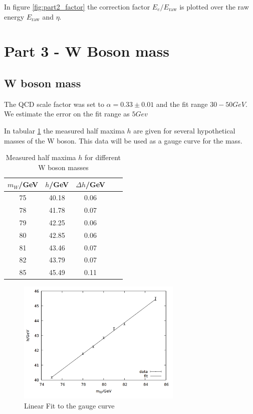 In figure \ref{fig:part2_factor} the correction factor $E_e/E_{\mathrm{raw}}$ is plotted over the raw energy $E_{\mathrm{raw}}$ and $\eta$. 

\section{Part 3 - W Boson mass}

\subsection{W boson mass}

The QCD scale factor was set to $\alpha = 0.33 \pm 0.01$ and the fit range $30 - 50 \si{GeV}$. We estimate the error on the fit range as $5 \si{Gev}$

In tabular \ref{tab:task3_33} the measured half maxima $h$ are given for several hypothetical masses of the W boson. This data will be used as a gauge curve for the mass.

\begin{table}
\centering
\caption{Measured half maxima $h$ for different W boson masses}
\begin{tabular}{ccccc}
\toprule
$m_W$/GeV & $h$/GeV & $\Delta h$/GeV\\ 
\midrule
75&	40.18&	0.06\\
78&	41.78&	0.07\\
79&	42.25&	0.06\\
80&	42.85&	0.06\\
81&	43.46&	0.07\\
82&	43.79&	0.07\\
85&	45.49&	0.11\\
\bottomrule
\end{tabular}
\label{tab:task3_33}
\end{table}

\begin{figure}
\centering
\includegraphics[width=0.7\textwidth]{data/33.png}
\caption{Linear Fit to the gauge curve}
\label{fig:task3_gauge}
\end{figure}

